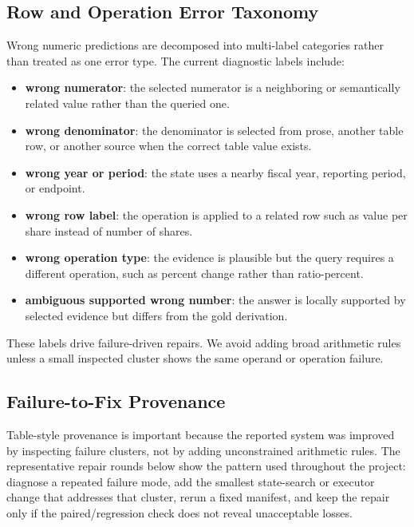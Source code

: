 \subsection{Row and Operation Error Taxonomy}

Wrong numeric predictions are decomposed into multi-label categories rather than
treated as one error type.  The current diagnostic labels include:
\begin{itemize}
    \item \textbf{wrong numerator}: the selected numerator is a neighboring or
    semantically related value rather than the queried one.
    \item \textbf{wrong denominator}: the denominator is selected from prose,
    another table row, or another source when the correct table value exists.
    \item \textbf{wrong year or period}: the state uses a nearby fiscal year,
    reporting period, or endpoint.
    \item \textbf{wrong row label}: the operation is applied to a related row
    such as value per share instead of number of shares.
    \item \textbf{wrong operation type}: the evidence is plausible but the
    query requires a different operation, such as percent change rather than
    ratio-percent.
    \item \textbf{ambiguous supported wrong number}: the answer is locally
    supported by selected evidence but differs from the gold derivation.
\end{itemize}
These labels drive failure-driven repairs.  We avoid adding broad arithmetic
rules unless a small inspected cluster shows the same operand or operation
failure.



\subsection{Failure-to-Fix Provenance}

Table-style provenance is important because the reported system was improved by
inspecting failure clusters, not by adding unconstrained arithmetic rules.  The
representative repair rounds below show the pattern used throughout the project:
diagnose a repeated failure mode, add the smallest state-search or executor
change that addresses that cluster, rerun a fixed manifest, and keep the repair
only if the paired/regression check does not reveal unacceptable losses.

